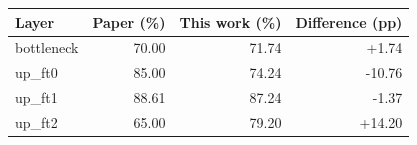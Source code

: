 \begin{tabular}{lrrr}
\toprule
Layer & Paper (\%) & This work (\%) & Difference (pp) \\
\midrule
bottleneck & 70.00 & 71.74 & +1.74 \\
up\_ft0 & 85.00 & 74.24 & -10.76 \\
up\_ft1 & 88.61 & 87.24 & -1.37 \\
up\_ft2 & 65.00 & 79.20 & +14.20 \\
\bottomrule
\end{tabular}
